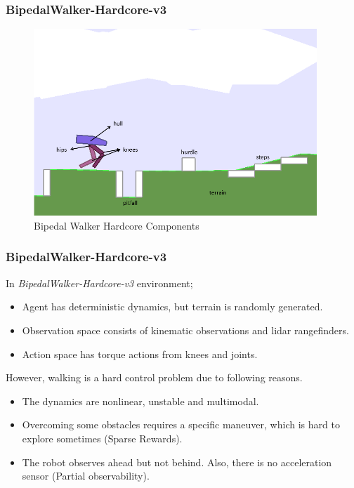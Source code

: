 \documentclass{beamer}
\begin{document}
\begin{frame}
\frametitle{BipedalWalker-Hardcore-v3}
\begin{figure}
	\centering
	\includegraphics[width=0.95\textwidth]{figures/bipedal/bpedal_annotated.png}
	\caption{Bipedal Walker Hardcore Components~\cite{noauthor_bipedalwalkerhardcore-v2_2021}}
	\label{fig:bipedal_hardcore_components}
\end{figure}
\end{frame}

\begin{frame}
\frametitle{BipedalWalker-Hardcore-v3}
In \textit{BipedalWalker-Hardcore-v3} environment;
\begin{itemize}
	\item Agent has deterministic dynamics, but terrain is randomly generated.
	\item Observation space consists of kinematic observations and lidar rangefinders.
	\item Action space has torque actions from knees and joints.
\end{itemize}
However, walking is a hard control problem due to following reasons.
\begin{itemize}
	\item The dynamics are nonlinear, unstable and multimodal. 
	\item Overcoming some obstacles requires a specific maneuver, which is hard to explore sometimes (Sparse Rewards).
	\item The robot observes ahead but not behind. Also, there is no acceleration sensor (Partial observability).
\end{itemize}
\end{frame}
\end{document}
